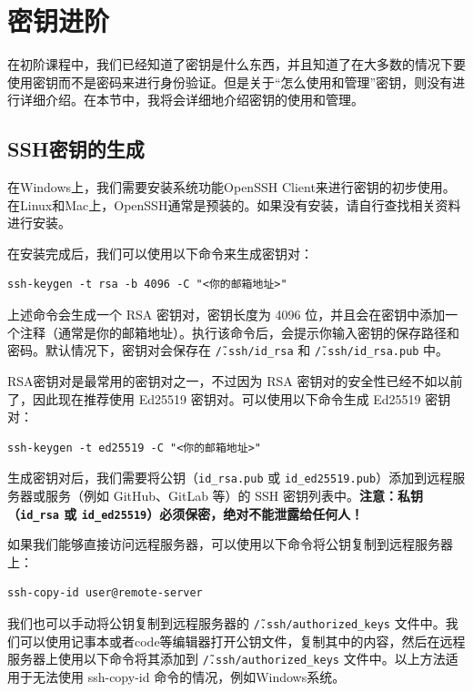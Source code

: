 \documentclass[../main.tex]{subfiles}
\begin{document}
\section{密钥进阶}

在初阶课程中，我们已经知道了密钥是什么东西，并且知道了在大多数的情况下要使用密钥而不是密码来进行身份验证。但是关于“怎么使用和管理”密钥，则没有进行详细介绍。在本节中，我将会详细地介绍密钥的使用和管理。

\subsection{SSH密钥的生成}

在Windows上，我们需要安装系统功能OpenSSH Client来进行密钥的初步使用。在Linux和Mac上，OpenSSH通常是预装的。如果没有安装，请自行查找相关资料进行安装。

在安装完成后，我们可以使用以下命令来生成密钥对：
\begin{verbatim}
ssh-keygen -t rsa -b 4096 -C "<你的邮箱地址>"
\end{verbatim}

上述命令会生成一个 RSA 密钥对，密钥长度为 4096 位，并且会在密钥中添加一个注释（通常是你的邮箱地址）。执行该命令后，会提示你输入密钥的保存路径和密码。默认情况下，密钥对会保存在 \texttt{\~/.ssh/id\_rsa} 和 \texttt{\~/.ssh/id\_rsa.pub} 中。

RSA密钥对是最常用的密钥对之一，不过因为 RSA 密钥对的安全性已经不如以前了，因此现在推荐使用 Ed25519 密钥对。可以使用以下命令生成 Ed25519 密钥对：
\begin{verbatim}
ssh-keygen -t ed25519 -C "<你的邮箱地址>"
\end{verbatim}

生成密钥对后，我们需要将公钥（\texttt{id\_rsa.pub} 或 \texttt{id\_ed25519.pub}）添加到远程服务器或服务（例如 GitHub、GitLab 等）的 SSH 密钥列表中。\textbf{注意：私钥（\texttt{id\_rsa} 或 \texttt{id\_ed25519}）必须保密，绝对不能泄露给任何人！}

如果我们能够直接访问远程服务器，可以使用以下命令将公钥复制到远程服务器上：
\begin{verbatim}
ssh-copy-id user@remote-server
\end{verbatim}

我们也可以手动将公钥复制到远程服务器的 \texttt{\~/.ssh/authorized\_keys} 文件中。我们可以使用记事本或者code等编辑器打开公钥文件，复制其中的内容，然后在远程服务器上使用以下命令将其添加到 \texttt{\~/.ssh/authorized\_keys} 文件中。以上方法适用于无法使用 ssh-copy-id 命令的情况，例如Windows系统。
\end{document}
